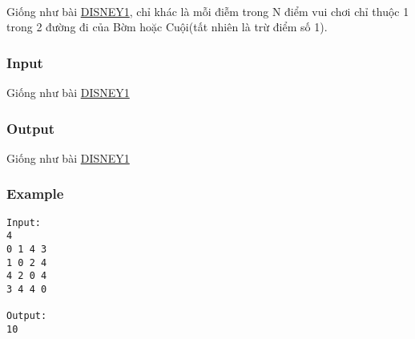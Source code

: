 

 

Giống như bài \href{http://vnoi.info/problems/show/DISNEY1/}{DISNEY1}, chỉ khác là mỗi điễm trong N điểm vui chơi chỉ thuộc 1 trong 2 đường đi của Bờm hoặc Cuội(tất nhiên là trừ điểm số 1).

\subsubsection{Input}

Giống như bài \href{http://vnoi.info/problems/show/DISNEY1/}{DISNEY1}

\subsubsection{Output}

Giống như bài \href{http://vnoi.info/problems/show/DISNEY1/}{DISNEY1}

\subsubsection{Example}
\begin{verbatim}
Input:
4
0 1 4 3
1 0 2 4
4 2 0 4
3 4 4 0

Output:
10
\end{verbatim}